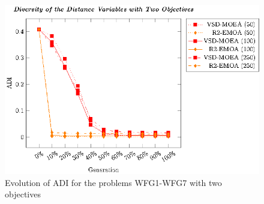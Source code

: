 \begin{figure}[t]
\centering
%
\includegraphics[scale=0.85]{Images/Graphic-Diversity_2obj_tikz-figure1.eps}
\caption{Evolution of ADI for the problems WFG1-WFG7 with two objectives}\label{fig:Diversity_2obj}
\end{figure}

